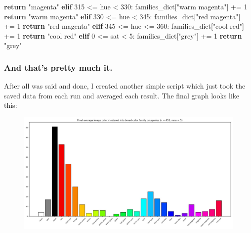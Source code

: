 \documentclass[11pt]{article}
\newenvironment{Shaded}{}{}
\newcommand{\DecValTok}[1]{\textcolor[rgb]{0.25,0.63,0.44}{{#1}}}
\newcommand{\StringTok}[1]{\textcolor[rgb]{0.25,0.44,0.63}{{#1}}}
\newcommand{\NormalTok}[1]{{#1}}
\newcommand{\ControlFlowTok}[1]{\textcolor[rgb]{0.00,0.44,0.13}{\textbf{{#1}}}}
\newcommand{\OperatorTok}[1]{\textcolor[rgb]{0.40,0.40,0.40}{{#1}}}
\begin{document}
\begin{Shaded}
\begin{Highlighting}[]
            \ControlFlowTok{return} \StringTok{"magenta"}
        \ControlFlowTok{elif} \DecValTok{315} \OperatorTok{<=}\NormalTok{ hue }\OperatorTok{<} \DecValTok{330}\NormalTok{:}
\NormalTok{            families_dict[}\StringTok{"warm magenta"}\NormalTok{] }\OperatorTok{+=} \DecValTok{1}
            \ControlFlowTok{return} \StringTok{"warm magenta"}
        \ControlFlowTok{elif} \DecValTok{330} \OperatorTok{<=}\NormalTok{ hue }\OperatorTok{<} \DecValTok{345}\NormalTok{:}
\NormalTok{            families_dict[}\StringTok{"red magenta"}\NormalTok{] }\OperatorTok{+=} \DecValTok{1}
            \ControlFlowTok{return} \StringTok{"red magenta"}
        \ControlFlowTok{elif} \DecValTok{345} \OperatorTok{<=}\NormalTok{ hue }\OperatorTok{<=} \DecValTok{360}\NormalTok{:}
\NormalTok{            families_dict[}\StringTok{"cool red"}\NormalTok{] }\OperatorTok{+=} \DecValTok{1}
            \ControlFlowTok{return} \StringTok{"cool red"}
    \ControlFlowTok{elif} \DecValTok{0} \OperatorTok{<=}\NormalTok{ sat }\OperatorTok{<} \DecValTok{5}\NormalTok{:}
\NormalTok{        families_dict[}\StringTok{"grey"}\NormalTok{] }\OperatorTok{+=} \DecValTok{1}
        \ControlFlowTok{return} \StringTok{"grey"}
\end{Highlighting}
\end{Shaded}

\hypertarget{and-thats-pretty-much-it.}{%
\subsubsection{And that's pretty much
it.}\label{and-thats-pretty-much-it.}}

After all was said and done, I created another simple script which just
took the saved data from each run and averaged each result. The final
graph looks like this:

\begin{landscape}
\begin{figure}
\centering
\includegraphics[width=8in]{./analyzed2/average_analysis.jpg}
\end{figure}
\end{landscape}
\end{document}
